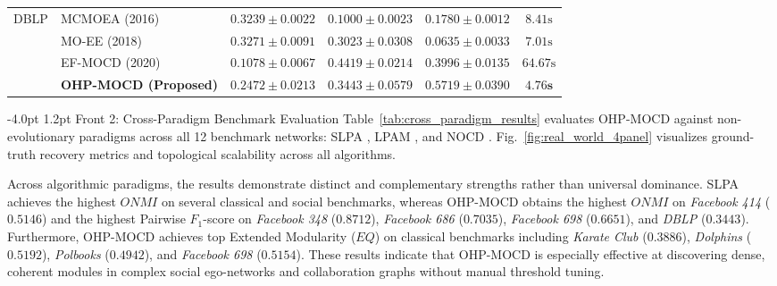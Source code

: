 \documentclass{svproc}
\makeatletter
\renewcommand\subsection{\@startsection{subsection}{2}{\z@}%
  {-4.0pt \@plus -0.5pt \@minus -0.5pt}%
  {1.2pt \@plus 0.5pt}%
  {\normalfont\normalsize\bfseries\boldmath}}
\makeatother
\begin{document}
\begin{table}[t]
{\begin{tabular}{@{}llcccc@{}}
\midrule
DBLP & MCMOEA (2016) & $0.3239 \pm 0.0022$ & $0.1000 \pm 0.0023$ & $0.1780 \pm 0.0012$ & $8.41\text{s}$ \\
 & MO-EE (2018) & $\mathbf{0.3271 \pm 0.0091}$ & $0.3023 \pm 0.0308$ & $0.0635 \pm 0.0033$ & $7.01\text{s}$ \\
 & EF-MOCD (2020) & $0.1078 \pm 0.0067$ & $\mathbf{0.4419 \pm 0.0214}$ & $0.3996 \pm 0.0135$ & $64.67\text{s}$ \\
 & \textbf{OHP-MOCD (Proposed)} & $0.2472 \pm 0.0213$ & $0.3443 \pm 0.0579$ & $\mathbf{0.5719 \pm 0.0390}$ & $\mathbf{4.76\text{s}}$ \\
\bottomrule
\end{tabular}%
}
\end{table}

\subsection{Front 2: Cross-Paradigm Benchmark Evaluation}\label{subsec:cross_paradigm}
Table~\ref{tab:cross_paradigm_results} evaluates OHP-MOCD against non-evolutionary paradigms across all 12 benchmark networks: SLPA \cite{xie2012}, LPAM \cite{ponomarenko2021}, and NOCD \cite{shchur2019}. Fig.~\ref{fig:real_world_4panel} visualizes ground-truth recovery metrics and topological scalability across all algorithms.

Across algorithmic paradigms, the results demonstrate distinct and complementary strengths rather than universal dominance. SLPA achieves the highest $ONMI$ on several classical and social benchmarks, whereas OHP-MOCD obtains the highest $ONMI$ on \textit{Facebook 414} ($0.5146$) and the highest Pairwise $F_1$-score on \textit{Facebook 348} ($0.8712$), \textit{Facebook 686} ($0.7035$), \textit{Facebook 698} ($0.6651$), and \textit{DBLP} ($0.3443$). Furthermore, OHP-MOCD achieves top Extended Modularity ($EQ$) on classical benchmarks including \textit{Karate Club} ($0.3886$), \textit{Dolphins} ($0.5192$), \textit{Polbooks} ($0.4942$), and \textit{Facebook 698} ($0.5154$). These results indicate that OHP-MOCD is especially effective at discovering dense, coherent modules in complex social ego-networks and collaboration graphs without manual threshold tuning.
\end{document}
